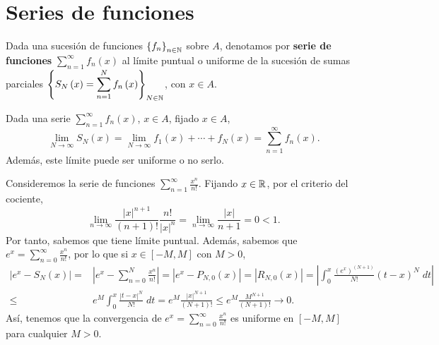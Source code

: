 \section{Series de funciones}
\begin{fdefinition}
	\normalfont Dada una sucesión de funciones $\displaystyle \left\{ f_{n}\right\} _{n\in\mathbb{N}} $ sobre $\displaystyle A $, denotamos por \textbf{serie de funciones} $\displaystyle \sum^{\infty}_{n = 1}f_{n}\left(x\right) $ al límite puntual o uniforme de la sucesión de sumas parciales $\displaystyle \left\{ S_{N}\left(x\right) = \sum^{N}_{n = 1}f_{n}\left(x\right)\right\} _{N\in\mathbb{N}} $, con $\displaystyle x \in A $. 
\end{fdefinition}
\begin{observation}
\normalfont Dada una serie $\displaystyle \sum^{\infty}_{n = 1}f_{n}\left(x\right) $, $\displaystyle x \in A $, fijado $\displaystyle x \in A $, 
\[\lim_{N \to \infty}S_{N}\left(x\right) = \lim_{N \to \infty}f_{1}\left(x\right) + \cdots + f_{N}\left(x\right) = \sum^{\infty}_{n = 1}f_{n}\left(x\right) .\]
Además, este límite puede ser uniforme o no serlo.
\end{observation}
\begin{eg}
\normalfont Consideremos la serie de funciones $\displaystyle \sum^{\infty}_{n = 1}\frac{x^{n}}{n!} $. Fijando $\displaystyle x \in \mathbb{R} $, por el criterio del cociente,
\[\lim_{n \to \infty}\frac{ \left|x\right|^{n+1}}{\left(n+1\right)!}\frac{n!}{ \left|x\right|^{n}} = \lim_{n \to \infty}\frac{ \left|x\right|}{n+1} = 0 < 1 .\]
Por tanto, sabemos que tiene límite puntual. Además, sabemos que $\displaystyle e^{x} = \sum^{\infty}_{n = 0}\frac{x^{n}}{n!} $, por lo que si $\displaystyle x \in \left[-M,M\right]  $ con $\displaystyle M > 0 $,
\[
\begin{split}
	\left|e^{x}-S_{N}\left(x\right)\right| = & \left|e^{x}-\sum^{N}_{n = 0}\frac{x^{n}}{n!}\right| = \left|e^{x}-P_{N,0}\left(x\right)\right| = \left|R_{N,0}\left(x\right)\right| = \left|\int^{x}_{0} \frac{\left(e^{x}\right)^{\left(N+1\right)}}{N!}\left(t-x\right)^{N} \; dt\right| \\
	\leq & e^{M}\int^{x}_{0} \frac{ \left|t-x\right|^{N}}{N!} \; dt 
	=  e^{M}\frac{ \left|x\right|^{N+1}}{\left(N+1\right)!} \leq e^{M}\frac{M^{N+1}}{\left(N+1\right)!} \to 0.
\end{split}
\]
Así, tenemos que la convergencia de $\displaystyle e^{x} = \sum^{\infty}_{n = 0}\frac{x^{n}}{n!} $ es uniforme en $\displaystyle \left[-M,M\right]  $ para cualquier $\displaystyle M > 0 $.
\end{eg}
